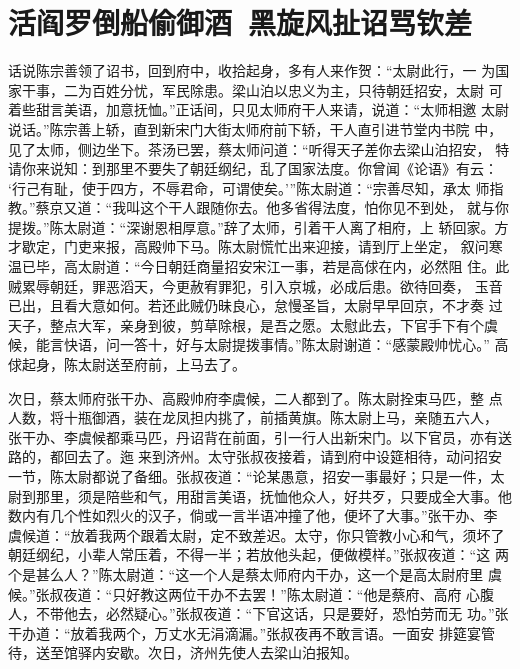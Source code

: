 \chapter{活阎罗倒船偷御酒~黑旋风扯诏骂钦差}

话说陈宗善领了诏书，回到府中，收拾起身，多有人来作贺：“太尉此行，一
为国家干事，二为百姓分忧，军民除患。梁山泊以忠义为主，只待朝廷招安，太尉
可着些甜言美语，加意抚恤。”正话间，只见太师府干人来请，说道：“太师相邀
太尉说话。”陈宗善上轿，直到新宋门大街太师府前下轿，干人直引进节堂内书院
中，见了太师，侧边坐下。茶汤已罢，蔡太师问道：“听得天子差你去梁山泊招安，
特请你来说知：到那里不要失了朝廷纲纪，乱了国家法度。你曾闻《论语》有云：
‘行己有耻，使于四方，不辱君命，可谓使矣。’”陈太尉道：“宗善尽知，承太
师指教。”蔡京又道：“我叫这个干人跟随你去。他多省得法度，怕你见不到处，
就与你提拨。”陈太尉道：“深谢恩相厚意。”辞了太师，引着干人离了相府，上
轿回家。方才歇定，门吏来报，高殿帅下马。陈太尉慌忙出来迎接，请到厅上坐定，
叙问寒温已毕，高太尉道：“今日朝廷商量招安宋江一事，若是高俅在内，必然阻
住。此贼累辱朝廷，罪恶滔天，今更赦宥罪犯，引入京城，必成后患。欲待回奏，
玉音已出，且看大意如何。若还此贼仍昧良心，怠慢圣旨，太尉早早回京，不才奏
过天子，整点大军，亲身到彼，剪草除根，是吾之愿。太慰此去，下官手下有个虞
候，能言快语，问一答十，好与太尉提拨事情。”陈太尉谢道：“感蒙殿帅忧心。”
高俅起身，陈太尉送至府前，上马去了。

次日，蔡太师府张干办、高殿帅府李虞候，二人都到了。陈太尉拴束马匹，整
点人数，将十瓶御酒，装在龙凤担内挑了，前插黄旗。陈太尉上马，亲随五六人，
张干办、李虞候都乘马匹，丹诏背在前面，引一行人出新宋门。以下官员，亦有送
路的，都回去了。迤来到济州。太守张叔夜接着，请到府中设筵相待，动问招安
一节，陈太尉都说了备细。张叔夜道：“论某愚意，招安一事最好；只是一件，太
尉到那里，须是陪些和气，用甜言美语，抚恤他众人，好共歹，只要成全大事。他
数内有几个性如烈火的汉子，倘或一言半语冲撞了他，便坏了大事。”张干办、李
虞候道：“放着我两个跟着太尉，定不致差迟。太守，你只管教小心和气，须坏了
朝廷纲纪，小辈人常压着，不得一半；若放他头起，便做模样。”张叔夜道：“这
两个是甚么人？”陈太尉道：“这一个人是蔡太师府内干办，这一个是高太尉府里
虞候。”张叔夜道：“只好教这两位干办不去罢！”陈太尉道：“他是蔡府、高府
心腹人，不带他去，必然疑心。”张叔夜道：“下官这话，只是要好，恐怕劳而无
功。”张干办道：“放着我两个，万丈水无涓滴漏。”张叔夜再不敢言语。一面安
排筵宴管待，送至馆驿内安歇。次日，济州先使人去梁山泊报知。

